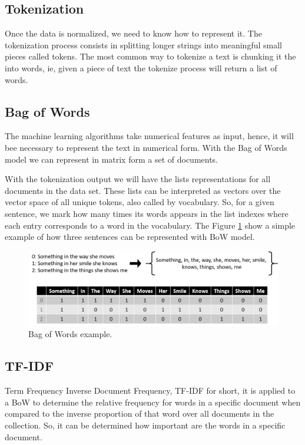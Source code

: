 \subsection{Tokenization}
	Once the data is normalized, we need to know how to represent it. The tokenization process consists in splitting longer strings into meaningful small pieces called tokens. The most common way to tokenize a text is chunking it the into words, ie, given a piece of text the tokenize process will return a list of words. 
	
	
\subsection{Bag of Words}
	The machine learning algorithms take numerical features as input, hence, it will bee necessary to represent the text in numerical form. With the Bag of Words model we can represent in matrix form a set of documents.
	 	
	With the tokenization output we will have the lists representations for all documents in the data set. These lists can be interpreted as vectors over the vector space of all unique tokens, also called by vocabulary. So, for a given sentence, we mark how many times its words appears in the list indexes where each entry corresponds to a word in the vocabulary. The Figure \ref{fig:bag-of-words} show a simple example of how three sentences can be represented with BoW model.
	
	
	\begin{figure}[h!]
		\centering
		\includegraphics[width=\linewidth]{01.Chapters/03.NLP/bag-of-words}
		\caption{Bag of Words example.}
		\label{fig:bag-of-words}
	\end{figure}
	

\subsection{TF-IDF}

	Term Frequency Inverse Document Frequency, TF-IDF for short, it is applied to a BoW to determine the relative frequency for words in a specific document when compared to the inverse proportion of that word over all documents in the collection. So, it can be determined how important are the words in a specific document. 
		
